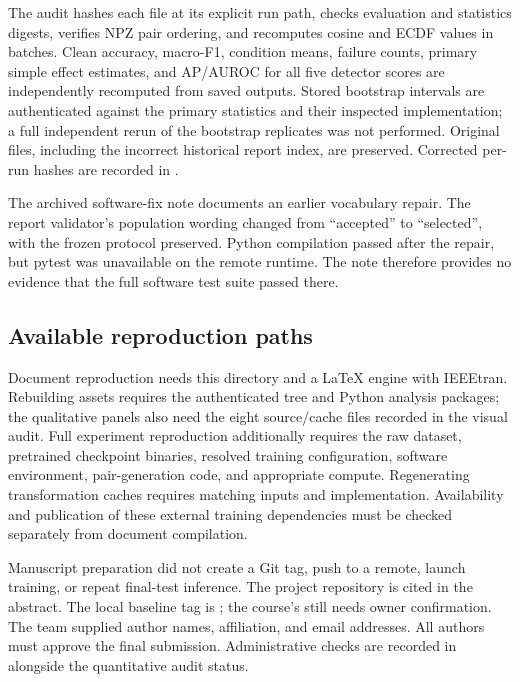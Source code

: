 The audit hashes each file at its explicit run path, checks evaluation and statistics digests, verifies NPZ pair ordering, and recomputes cosine and ECDF values in batches. Clean accuracy, macro-F1, condition means, failure counts, primary simple effect estimates, and AP/AUROC for all five detector scores are independently recomputed from saved outputs. Stored bootstrap intervals are authenticated against the primary statistics and their inspected implementation; a full independent rerun of the bootstrap replicates was not performed. Original files, including the incorrect historical report index, are preserved. Corrected per-run hashes are recorded in .

The archived software-fix note documents an earlier vocabulary repair. The report validator's population wording changed from ``accepted'' to ``selected'', with the frozen protocol preserved. Python compilation passed after the repair, but pytest was unavailable on the remote runtime. The note therefore provides no evidence that the full software test suite passed there.

\subsection{Available reproduction paths}
Document reproduction needs this directory and a LaTeX engine with IEEEtran. Rebuilding assets requires the authenticated  tree and Python analysis packages; the qualitative panels also need the eight source/cache files recorded in the visual audit. Full experiment reproduction additionally requires the raw dataset, pretrained checkpoint binaries, resolved training configuration, software environment, pair-generation code, and appropriate compute. Regenerating transformation caches requires matching inputs and implementation. Availability and publication of these external training dependencies must be checked separately from document compilation.

Manuscript preparation did not create a Git tag, push to a remote, launch training, or repeat final-test inference. The project repository is cited in the abstract. The local baseline tag is ; the course's  still needs owner confirmation. The team supplied author names, affiliation, and email addresses. All authors must approve the final submission. Administrative checks are recorded in  alongside the quantitative audit status.

